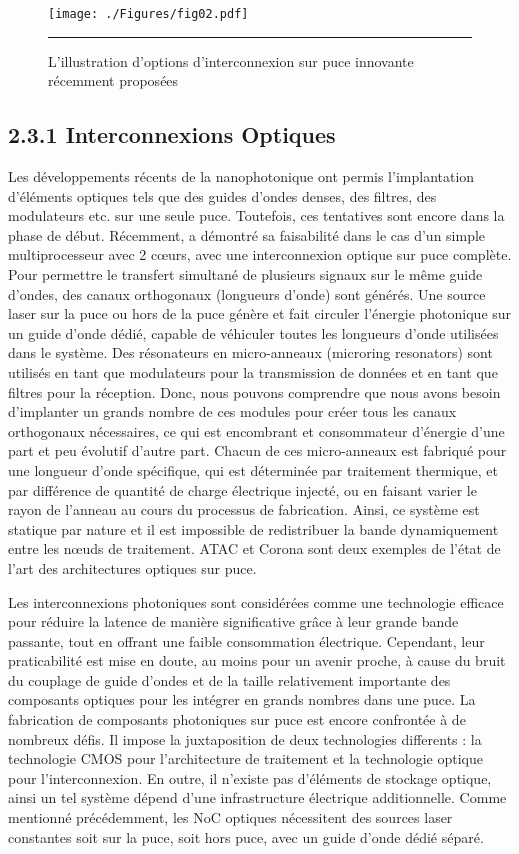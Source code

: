 \begin{figure}[htbp]
  \centering
    \texttt{[image: ./Figures/fig02.pdf]}
    \rule{35em}{0.5pt}
  \caption[L'illustration d'options d'interconnexion]{L'illustration d'options d'interconnexion sur puce innovante récemment proposées}
  \label{fig:Electron}
\end{figure}

\subsection*{2.3.1 Interconnexions Optiques}
Les développements récents de la nanophotonique ont permis l’implantation d'éléments optiques tels que des guides d'ondes denses, des filtres, des modulateurs etc. sur une seule puce. Toutefois, ces tentatives sont encore dans la phase de début. Récemment, \cite{sun2015single} a démontré sa faisabilité dans le cas d'un simple multiprocesseur avec 2 cœurs, avec une interconnexion optique sur puce complète. Pour permettre le transfert simultané de plusieurs signaux sur le même guide d'ondes, des canaux orthogonaux (longueurs d'onde) sont générés. Une source laser sur la puce ou hors de la puce génère et fait circuler l'énergie photonique sur un guide d'onde dédié, capable de véhiculer toutes les longueurs d'onde utilisées dans le système. Des résonateurs en micro-anneaux (microring resonators) sont utilisés en tant que modulateurs pour la transmission de données et en tant que filtres pour la réception. Donc, nous pouvons comprendre que nous avons besoin d'implanter un grands nombre de ces modules pour créer tous les canaux orthogonaux nécessaires, ce qui est encombrant et consommateur d’énergie d’une part et peu évolutif d’autre part. Chacun de ces micro-anneaux est fabriqué pour une longueur d'onde spécifique, qui est déterminée par traitement thermique, et par différence de quantité de charge électrique injecté, ou en faisant varier le rayon de l’anneau au cours du processus de fabrication. Ainsi, ce système est statique par nature et il est impossible de redistribuer la bande dynamiquement entre les nœuds de traitement. ATAC et Corona sont deux exemples de l'état de l'art des architectures optiques sur puce.

Les interconnexions photoniques sont considérées comme une technologie efficace pour réduire la latence de manière significative grâce à leur grande bande passante, tout en offrant une faible consommation électrique. Cependant, leur praticabilité est mise en doute, au moins pour un avenir proche, à cause du bruit du couplage de guide d'ondes et de la taille relativement importante des composants optiques pour les intégrer en grands nombres dans une puce. La fabrication de composants photoniques sur puce est encore confrontée à de nombreux défis. Il impose la juxtaposition de deux technologies differents : la technologie CMOS pour l'architecture de traitement et la technologie optique pour l'interconnexion. En outre, il n’existe pas d'éléments de stockage optique, ainsi un tel système dépend d'une infrastructure électrique additionnelle. Comme mentionné précédemment, les NoC optiques nécessitent des sources laser constantes soit sur la puce, soit hors puce, avec un guide d'onde dédié séparé.

